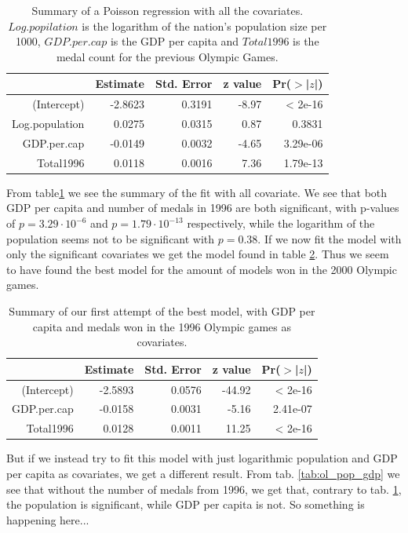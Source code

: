 \documentclass[a4paper,norsk, 10pt]{article}
\begin{document}
\begin{table}[!htb]
\centering
\begin{tabular}{rrrrr}
  \hline
 & Estimate & Std. Error & z value & Pr($>$|$z$|) \\ 
  \hline
(Intercept) & -2.8623 & 0.3191 & -8.97 & < 2e-16 \\ 
  Log.population & 0.0275 & 0.0315 & 0.87 & 0.3831 \\ 
  GDP.per.cap & -0.0149 & 0.0032 & -4.65 & 3.29e-06 \\ 
  Total1996 & 0.0118 & 0.0016 & 7.36 & 1.79e-13 \\ 
   \hline
\end{tabular}
\caption{Summary of a Poisson regression with all the covariates. $Log.popilation$ is the logarithm of the nation's population size per 1000, $GDP.per.cap$ is the GDP per capita and $Total1996$ is the medal count for the previous Olympic Games.}\label{tab:ol_full_it}
\end{table}


From table\ref{tab:ol_full_it} we see the summary of the fit with all covariate. We see that both GDP per capita and number of medals in 1996 are both significant, with p-values of $p=3.29\cdot 10^{-6}$ and $p=1.79\cdot 10^{-13}$ respectively, while the logarithm of the population seems not to be significant with $p = 0.38$. If we now fit the model with only the significant covariates we get the model found in table \ref{tab:ol_96_gdp}. Thus we seem to have found the best model for the amount of models won in the 2000 Olympic games. 

\begin{table}[!htb]
\centering
\begin{tabular}{rrrrr}
  \hline
 & Estimate & Std. Error & z value & Pr($>$|$z$|) \\ 
  \hline
(Intercept) & -2.5893 & 0.0576 & -44.92 & < 2e-16 \\ 
  GDP.per.cap & -0.0158 & 0.0031 & -5.16 & 2.41e-07 \\ 
  Total1996 & 0.0128 & 0.0011 & 11.25 & < 2e-16 \\ 
   \hline
\end{tabular}
\caption{Summary of our first attempt of the best model, with GDP per capita and medals won in the 1996 Olympic games as covariates.}\label{tab:ol_96_gdp}
\end{table}

But if we instead try to fit this model with just logarithmic population and GDP per capita as covariates, we get a different result. From tab. \ref{tab:ol_pop_gdp} we see that without the number of medals from 1996, we get that, contrary to tab. \ref{tab:ol_full_it}, the population is significant, while GDP per capita is not. So something is happening here...
\end{document}
